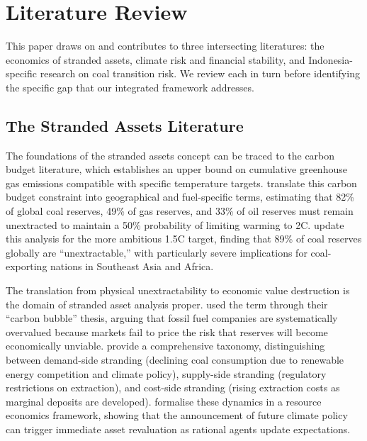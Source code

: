 
\section{Literature Review}
\label{sec:literature}

This paper draws on and contributes to three intersecting literatures: the economics of stranded assets, climate risk and financial stability, and Indonesia-specific research on coal transition risk. We review each in turn before identifying the specific gap that our integrated framework addresses.

\subsection{The Stranded Assets Literature}
\label{subsec:stranded_assets}

The foundations of the stranded assets concept can be traced to the carbon budget literature, which establishes an upper bound on cumulative greenhouse gas emissions compatible with specific temperature targets. \citet{McGlade2015} translate this carbon budget constraint into geographical and fuel-specific terms, estimating that 82\% of global coal reserves, 49\% of gas reserves, and 33\% of oil reserves must remain unextracted to maintain a 50\% probability of limiting warming to 2\textdegree C. \citet{Welsby2021} update this analysis for the more ambitious 1.5\textdegree C target, finding that 89\% of coal reserves globally are ``unextractable,'' with particularly severe implications for coal-exporting nations in Southeast Asia and Africa.

The translation from physical unextractability to economic value destruction is the domain of stranded asset analysis proper. \citet{CarbonTracker2012} used the term through their ``carbon bubble'' thesis, arguing that fossil fuel companies are systematically overvalued because markets fail to price the risk that reserves will become economically unviable. \citet{Caldecott2021} provide a comprehensive taxonomy, distinguishing between demand-side stranding (declining coal consumption due to renewable energy competition and climate policy), supply-side stranding (regulatory restrictions on extraction), and cost-side stranding (rising extraction costs as marginal deposits are developed). \citet{VanDerPloeg2020} formalise these dynamics in a resource economics framework, showing that the announcement of future climate policy can trigger immediate asset revaluation as rational agents update expectations.

